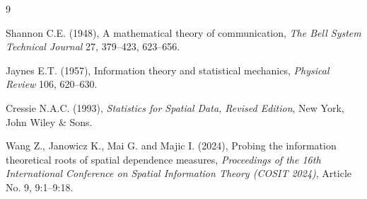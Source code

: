 \documentclass[twoside]{article}
\begin{document}
\begin{thebibliography}{9}
	
	Shannon C.E. (1948), A mathematical theory of communication, {\it The Bell System Technical Journal} 27, 379--423, 623--656.
	
	Jaynes E.T. (1957), Information theory and statistical mechanics, {\it Physical Review} 106, 620--630.
	
	Cressie N.A.C. (1993), {\it Statistics for Spatial Data, Revised Edition}, New York, John Wiley $ \&$ Sons.
	
	Wang Z., Janowicz K., Mai G. and Majic I. (2024), Probing the information theoretical roots of spatial dependence measures, {\it Proceedings of the 16th International Conference on Spatial Information Theory (COSIT 2024)}, Article No. 9, 9:1--9:18.
	
\end{thebibliography}

 
\end{document}
